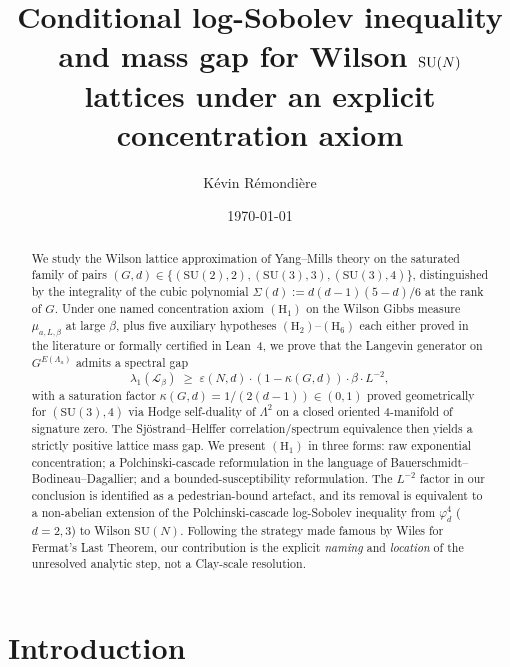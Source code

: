 \documentclass[11pt,reqno]{amsart}
\title[Conditional LSI and mass gap for Wilson $\SUN$ lattices]{Conditional log-Sobolev inequality and mass gap for Wilson $\SUN$ lattices under an explicit concentration axiom}
\author{K\'evin R\'emondi\`ere}
\date{\today}
\theoremstyle{plain}
\theoremstyle{definition}
\theoremstyle{remark}
\newcommand{\calL}{\mathcal{L}}
\newcommand{\SUN}{\mathrm{SU}(N)}
\begin{document}
\begin{abstract}
We study the Wilson lattice approximation of Yang--Mills theory on the saturated family of pairs $(G, d) \in \{(\mathrm{SU}(2), 2), (\mathrm{SU}(3), 3), (\mathrm{SU}(3), 4)\}$, distinguished by the integrality of the cubic polynomial $\Sigma(d) := d(d-1)(5-d)/6$ at the rank of $G$. Under one named concentration axiom $(\mathrm{H}_1)$ on the Wilson Gibbs measure $\mu_{a, L, \beta}$ at large $\beta$, plus five auxiliary hypotheses $(\mathrm{H}_2)$--$(\mathrm{H}_6)$ each either proved in the literature or formally certified in Lean~4, we prove that the Langevin generator on $G^{E(\Lambda_a)}$ admits a spectral gap
\[
  \lambda_1(\calL_\beta) \;\ge\; \varepsilon(N, d) \cdot (1 - \kappa(G, d)) \cdot \beta \cdot L^{-2},
\]
with a saturation factor $\kappa(G, d) = 1/(2(d-1)) \in (0, 1)$ proved geometrically for $(\mathrm{SU}(3), 4)$ via Hodge self-duality of $\Lambda^2$ on a closed oriented $4$-manifold of signature zero. The Sj\"ostrand--Helffer correlation/spectrum equivalence then yields a strictly positive lattice mass gap. We present $(\mathrm{H}_1)$ in three forms: raw exponential concentration; a Polchinski-cascade reformulation in the language of Bauerschmidt--Bodineau--Dagallier; and a bounded-susceptibility reformulation. The $L^{-2}$ factor in our conclusion is identified as a pedestrian-bound artefact, and its removal is equivalent to a non-abelian extension of the Polchinski-cascade log-Sobolev inequality \cite{BD22, BBD24} from $\varphi^4_d$ ($d=2,3$) to Wilson $\SUN$. Following the strategy made famous by Wiles for Fermat's Last Theorem, our contribution is the explicit \emph{naming} and \emph{location} of the unresolved analytic step, not a Clay-scale resolution.
\end{abstract}

\maketitle

\setcounter{tocdepth}{1}
\tableofcontents

\section{Introduction}
\label{sec:intro}
\end{document}
